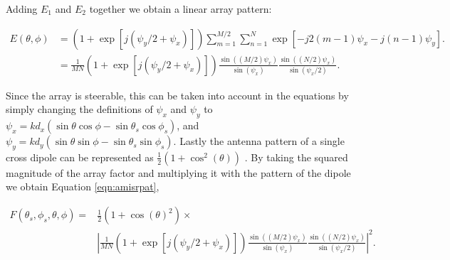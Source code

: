 \noindent Adding $E_1$ and $E_2$ together we obtain a linear array pattern:

\begin{equation} \label{eq1}
\begin{split}
E(\theta,\phi) &= \displaystyle  \left(1+ \exp\left[j(\psi_y/2 + \psi_x)\right]\right)\sum_{m=1}^{M/2}\sum_{n=1}^{N}  \exp\left[-j2\left(m-1\right) \psi_x -j\left(n-1\right) \psi_y\right].\\
& = \frac{1}{MN} \left(1+ \exp\left[j(\psi_y/2 + \psi_x)\right]\right)\frac{\sin((M/2) \psi_x)}{\sin(\psi_x)} \frac{\sin((N/2) \psi_x)}{\sin(\psi_x/2)}.
\end{split}
\end{equation}

Since the array is steerable, this can be taken into account in the equations by simply changing the definitions of $\psi_x $ and $\psi_y$ to $\psi_x = k d_x(\sin\theta\cos\phi-\sin\theta_s\cos\phi_s)$, and $\psi_y = k d_y(\sin\theta\sin\phi-\sin\theta_s\sin\phi_s)$. Lastly the antenna pattern of a single cross dipole can be represented as $ \frac{1}{2}(1+\cos^2(\theta))$ \citep{Balanis:2005:ATA:1208379}. By taking the squared magnitude of the array factor and multiplying it with the pattern of the dipole we obtain Equation \ref{eqn:amisrpat},

\begin{equation}
\label{eqn:amisrpatfinal}
\begin{split}
F(\theta_s,\phi_s,\theta,\phi) =& \frac{1}{2}(1+\cos(\theta)^2) \times \\& \left| \frac{1}{MN} \left(1+ \exp\left[j(\psi_y/2 + \psi_x)\right]\right)\frac{\sin((M/2) \psi_x)}{\sin(\psi_x)} \frac{\sin((N/2) \psi_x)}{\sin(\psi_x/2)}\right|^2.
\end{split}
\end{equation}